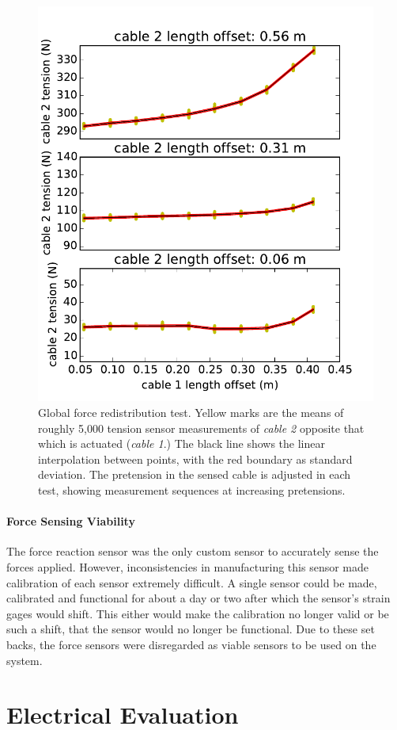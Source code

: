 \begin{appendices}
\begin{figure}[thpb]
      \centering
      \includegraphics[width=0.55\columnwidth]{tex/img/sensor2_original}
      \caption{Global force redistribution test. Yellow marks are the means of roughly 5,000 tension sensor measurements of \emph{cable 2} opposite that which is actuated (\emph{cable 1}.) The black line shows the linear interpolation between points, with the red boundary as standard deviation. The pretension in the sensed cable is adjusted in each test, showing measurement sequences at increasing pretensions.}
      \label{fig:sensor2data_forcedistribution}
\end{figure}

\paragraph{Force Sensing Viability}
The force reaction sensor was the only custom sensor to accurately sense the forces applied.
However, inconsistencies in manufacturing this sensor made calibration of each sensor extremely difficult.
A single sensor could be made, calibrated and functional for about a day or two after which the sensor's strain gages would shift.
This either would make the calibration no longer valid or be such a shift, that the sensor would no longer be functional.
Due to these set backs, the force sensors were disregarded as viable sensors to be used on the system.

\section{Electrical Evaluation}


\end{appendices}
